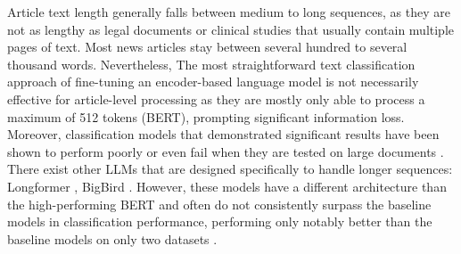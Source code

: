 Article text length generally falls between medium to long sequences, as they are not as lengthy as legal documents or clinical studies that usually contain multiple pages of text. Most news articles stay between several hundred to several thousand words. Nevertheless, The most straightforward text classification approach of fine-tuning an encoder-based language model is not necessarily effective for article-level processing as they are mostly only able to process a maximum of 512 tokens (BERT), prompting significant information loss. Moreover, classification models that demonstrated significant results have been shown to perform poorly or even fail when they are tested on large documents \cite{wan-2019-long-length}. There exist other LLMs that are designed specifically to handle longer sequences: Longformer \cite{beltagy-2020-longformer}, BigBird \cite{zaheer-2021-bigbird}. However, these models have a different architecture than the high-performing BERT and often do not consistently surpass the baseline models in classification performance, performing only  notably better than the baseline models on only two datasets \cite{park-2022-efficient}.


